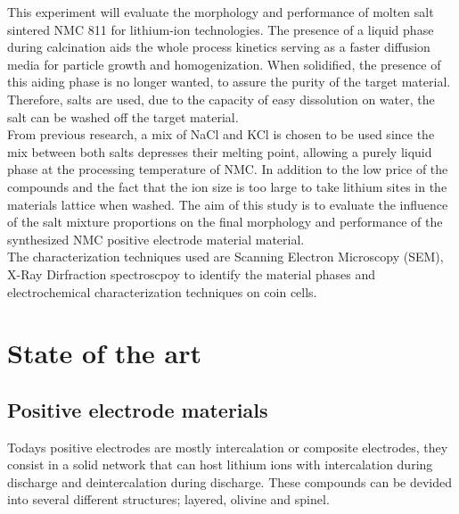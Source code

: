\documentclass{article}
\begin{document}
This experiment will evaluate the morphology and performance of molten salt sintered NMC 811 for lithium-ion technologies. The presence of a liquid phase during calcination aids the whole process kinetics serving as a faster diffusion media for particle growth and homogenization. When solidified, the presence of this aiding phase is no longer wanted, to assure the purity of the target material.  Therefore, salts are used, due to the capacity of easy dissolution on water, the salt can be washed off the target material\cite{Heuristics}.\\

From previous research, a mix of NaCl and KCl is chosen to be used since the mix between both salts depresses their melting point, allowing a purely liquid phase at the processing temperature of NMC. In addition to the low price of the compounds and the fact that the ion size is too large to take lithium sites in the materials lattice when washed. The aim of this study is to evaluate the influence of the salt mixture proportions on the final morphology and performance of the synthesized NMC positive electrode material material\cite{meltingp}.\\

The characterization techniques used are Scanning Electron Microscopy (SEM), X-Ray Dirfraction spectroscpoy to identify the material phases and electrochemical characterization techniques on coin cells.  \\
\section{State of the art}
\subsection{Positive electrode materials}

Todays positive electrodes are mostly intercalation or composite electrodes, they consist in a solid network that can host lithium ions with intercalation during discharge and deintercalation during discharge.
These compounds can be devided into several different structures; layered, olivine and spinel. \cite{topo} \\
\end{document}
